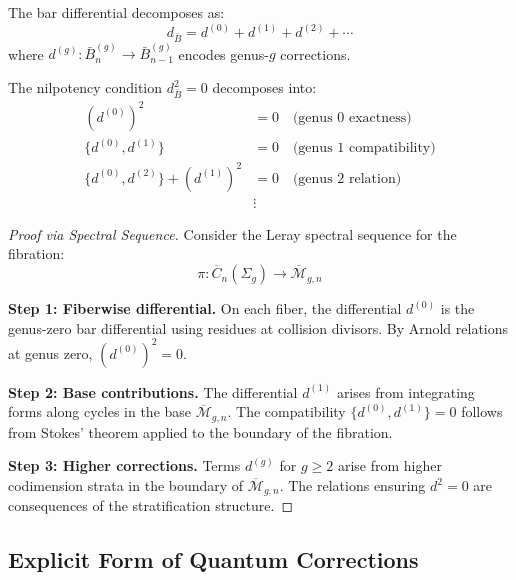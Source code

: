 \begin{theorem}
\label{thm:genus-differential}
The bar differential decomposes as:
\begin{equation}
d_{\bar{B}} = d^{(0)} + d^{(1)} + d^{(2)} + \cdots
\end{equation}
where $d^{(g)}: \bar{B}^{(g)}_n \to \bar{B}^{(g)}_{n-1}$ encodes genus-$g$ corrections.

The nilpotency condition $d_{\bar{B}}^2 = 0$ decomposes into:
\begin{align}
(d^{(0)})^2 &= 0 \quad \text{(genus 0 exactness)}\\
\{d^{(0)}, d^{(1)}\} &= 0 \quad \text{(genus 1 compatibility)}\\
\{d^{(0)}, d^{(2)}\} + (d^{(1)})^2 &= 0 \quad \text{(genus 2 relation)}\\
&\vdots
\end{align}
\end{theorem}

\begin{proof}[Proof via Spectral Sequence]
Consider the Leray spectral sequence for the fibration:
\begin{equation}
\pi: \overline{C}_n(\Sigma_g) \to \overline{\mathcal{M}}_{g,n}
\end{equation}

\textbf{Step 1: Fiberwise differential.} On each fiber, the differential $d^{(0)}$ is the genus-zero bar differential using residues at collision divisors. By Arnold relations at genus zero, $(d^{(0)})^2 = 0$.

\textbf{Step 2: Base contributions.} The differential $d^{(1)}$ arises from integrating forms along cycles in the base $\overline{\mathcal{M}}_{g,n}$. The compatibility $\{d^{(0)}, d^{(1)}\} = 0$ follows from Stokes' theorem applied to the boundary of the fibration.

\textbf{Step 3: Higher corrections.} Terms $d^{(g)}$ for $g \geq 2$ arise from higher codimension strata in the boundary of $\overline{\mathcal{M}}_{g,n}$. The relations ensuring $d^2 = 0$ are consequences of the stratification structure.
\end{proof}

\subsection{Explicit Form of Quantum Corrections}

